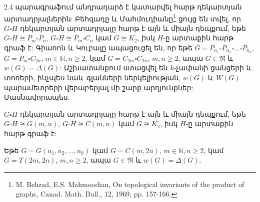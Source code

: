 2.4 պարագրաֆում անդրադարձ է կատարվել հարթ դեկարտյան արտադրյալներին: Բեհզադը և Մահմուդիանը\footnote{M. Behzad, E.S. Mahmoodian, On topological invariants of the product of graphs, Canad. Math. Bull., 12, 1969, pp. 157-166.} ցույց են տվել, որ $G \square H$ դեկարտյան արտադրյալը հարթ է այն և միայն դեպքում, եթե
$G\square H \cong P_m \square P_n$, $G\square H \cong P_m \square C_n$ կամ $G \cong K_2$, իսկ $H$-ը արտաքին հարթ գրաֆ է: Գիառոն և Կուբալը ապացուցել են, որ եթե $G=P_{n_1} \square P_{n_2} \square \ldots \square P_{n_k}$, $G=P_m \square C_{2n}$, $m\in \mathbb{N}, n\geq 2$, կամ $G=C_{2m} \square C_{2n}$, $m,n\geq 2$, ապա $G\in \mathfrak{N}$ և $w(G)=\Delta(G)$: 
Աշխատանքում ստացվել են $k$-չափանի ցանցերի և տոռերի, ինչպես նաև գլանների ներկելիության, $w(G)$ և $W(G)$ պարամետրերի վերաբերյալ մի շարք արդյունքներ: Մասնավորապես.

\begin{hide}
\begin{lemma}
\label{t2_behzad} $G \square H$ դեկարտյան արտադրյալը հարթ է այն և միայն դեպքում, եթե
$G\square H \cong G(m,n)$, $G\square H \cong C(m,n)$ կամ $G \cong K_2$, իսկ $H$-ը արտաքին հարթ գրաֆ է:
\end{lemma}
\begin{theorem}
\label{t2_Giaro_w} \cite{GiaroKubale1997} Եթե $G=G(n_{1},n_{2},\ldots,n_{k})$ կամ $G=C(m,2n)$, $m\in \mathbb{N}, n\geq 2$, կամ $G=T(2m,2n)$, $m,n\geq 2$, ապա $G\in \mathfrak{N}$ և $w(G)=\Delta(G)$.
\end{theorem}
\end{hide}

